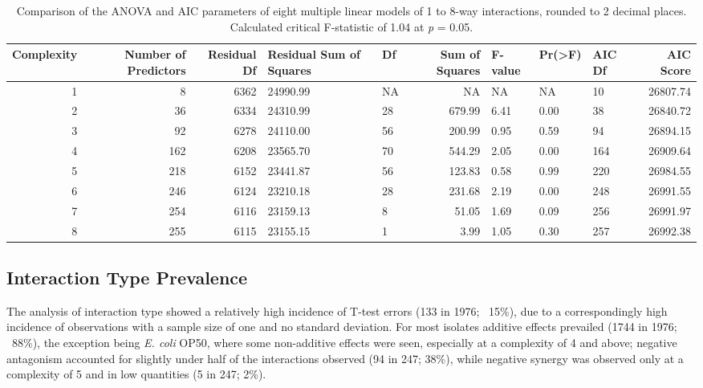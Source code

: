 \documentclass[final,1p,times]{elsarticle}
\begin{document}
\begin{table}[H]
\centering
\scriptsize
\begin{tabular}{N N N P O N O O O N}
\toprule 
\textbf{Complexity} & \textbf{Number of Predictors} & \textbf{Residual Df} & \textbf{Residual Sum of Squares} & \textbf{Df} & \textbf{Sum of Squares} & \textbf{F-value} & \textbf{Pr(>F)} & \textbf{AIC Df} & \textbf{AIC Score} \\
\midrule
{}   1 & 8   & 6362 & 24990.99 & NA  & NA        & NA   & NA   & 10  & 26807.74 \\
                    2 & 36  & 6334 & 24310.99 & 28  & 679.99    & 6.41 & 0.00 & 38  & 26840.72 \\
   3 & 92  & 6278 & 24110.00 & 56  & 200.99    & 0.95 & 0.59 & 94  & 26894.15 \\
                    4 & 162 & 6208 & 23565.70 & 70  & 544.29    & 2.05 & 0.00 & 164 & 26909.64 \\
   5 & 218 & 6152 & 23441.87 & 56  & 123.83    & 0.58 & 0.99 & 220 & 26984.55 \\
                    6 & 246 & 6124 & 23210.18 & 28  & 231.68    & 2.19 & 0.00 & 248 & 26991.55 \\
   7 & 254 & 6116 & 23159.13 & 8   & 51.05     & 1.69 & 0.09 & 256 & 26991.97 \\
                    8 & 255 & 6115 & 23155.15 & 1   & 3.99      & 1.05 & 0.30 & 257 & 26992.38 \\     
\bottomrule
\end{tabular}
\caption{Comparison of the ANOVA and AIC parameters of eight multiple linear models of 1 to 8-way interactions, rounded to 2 decimal places. Calculated critical F-statistic of 1.04 at \textit{p} = 0.05.}
\label{tab:lmodels}
\end{table}

\newpage
\subsection{Interaction Type Prevalence}
\label{S:3:7}

The analysis of interaction type showed a relatively high incidence of T-test errors (133 in 1976; ~15\%), due to a correspondingly high incidence of observations with a sample size of one and no standard deviation. For most isolates additive effects prevailed (1744 in 1976; ~88\%), the exception being \textit{E. coli} OP50, where some non-additive effects were seen, especially at a complexity of 4 and above; negative antagonism accounted for slightly under half of the interactions observed (94 in 247; 38\%), while negative synergy was observed only at a complexity of 5 and in low quantities (5 in 247; 2\%).
\end{document}
